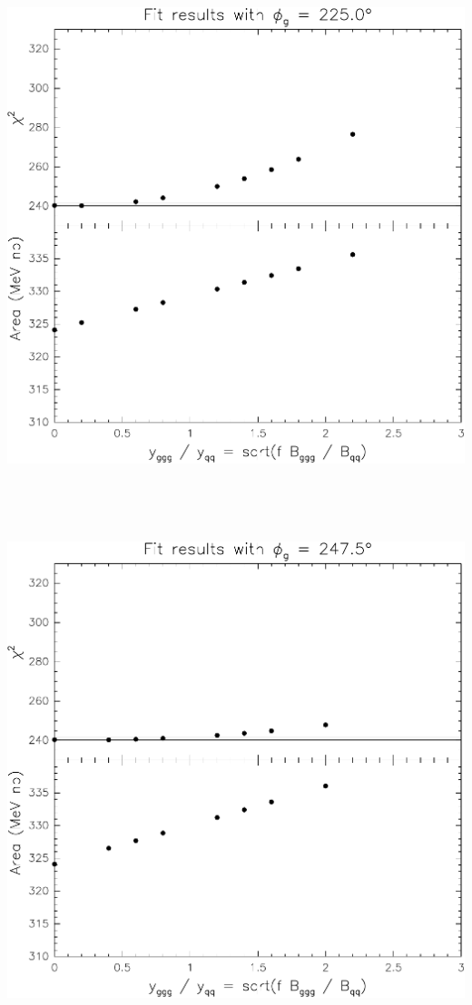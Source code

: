 \documentclass[12pt]{article}
\begin{document}
\vfill

\mbox{ }

\pagebreak

\mbox{ }

\vfill

\includegraphics[width=\linewidth]{interference-k}

\vfill

\mbox{ }

\pagebreak

\mbox{ }

\vfill

\includegraphics[width=\linewidth]{interference-l}
\end{document}
